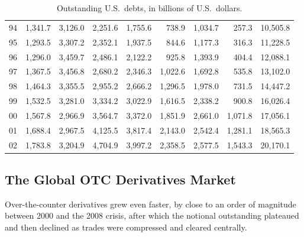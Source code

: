 \begin{table}[H]
\begin{tabular}{c rrrrrrr r}
		94   & 1,341.7   & 3,126.0  & 2,251.6                                                     & 1,755.6  & 738.9   & 1,034.7  & 257.3   & 10,505.8 \\
		95   & 1,293.5   & 3,307.2  & 2,352.1                                                     & 1,937.5  & 844.6   & 1,177.3  & 316.3   & 11,228.5 \\
		96   & 1,296.0   & 3,459.7  & 2,486.1                                                     & 2,122.2  & 925.8   & 1,393.9  & 404.4   & 12,088.1 \\
		97   & 1,367.5   & 3,456.8  & 2,680.2                                                     & 2,346.3  & 1,022.6 & 1,692.8  & 535.8   & 13,102.0 \\
		98   & 1,464.3   & 3,355.5  & 2,955.2                                                     & 2,666.2  & 1,296.5 & 1,978.0  & 731.5   & 14,447.2 \\
		99   & 1,532.5   & 3,281.0  & 3,334.2                                                     & 3,022.9  & 1,616.5 & 2,338.2  & 900.8   & 16,026.4 \\
		00   & 1,567.8   & 2,966.9  & 3,564.7                                                     & 3,372.0  & 1,851.9 & 2,661.0  & 1,071.8 & 17,056.1 \\
		01   & 1,688.4   & 2,967.5  & 4,125.5                                                     & 3,817.4  & 2,143.0 & 2,542.4  & 1,281.1 & 18,565.3 \\
		02   & 1,783.8   & 3,204.9  & 4,704.9                                                     & 3,997.2  & 2,358.5 & 2,577.5  & 1,543.3 & 20,170.1 \\
		\bottomrule
	\end{tabular}
	\caption{Outstanding U.S.\ debts, in billions of U.S.\ dollars.}
	\label{tab:us-debts}
\end{table}

\subsection{The Global OTC Derivatives Market}


\suppstart
Over-the-counter derivatives grew even faster, by close to an order of magnitude between 2000 and the 2008 crisis, after which the notional outstanding plateaued and then declined as trades were compressed and cleared centrally.
\suppend

